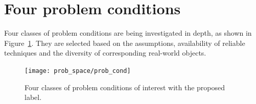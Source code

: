 \section{Four problem conditions}
\label{sec:four_prob_cond}
Four classes of problem conditions are being investigated in depth, as shown in Figure~\ref{fig:prob_cond}. They are selected based on the assumptions, availability of reliable techniques and the diversity of corresponding real-world objects.
\begin{figure}[!htbp]
\centering
\texttt{[image: prob\_space/prob\_cond]}
\caption{Four classes of problem conditions of interest with the proposed label.}
\label{fig:prob_cond}
\end{figure}